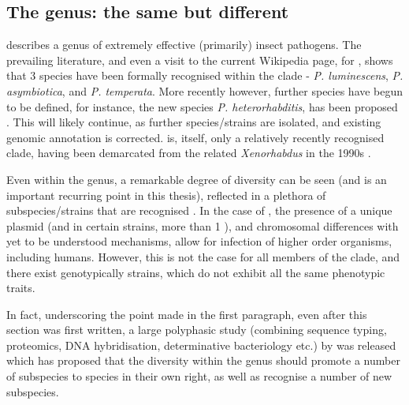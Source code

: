 \subsection{The \Pa{} genus: the same but different}
\Pa{} describes a genus of extremely effective (primarily) insect pathogens. The prevailing literature, and even a visit to the current Wikipedia page, for \Pa{}, shows that 3 species have been formally recognised within the clade - \textit{P. luminescens}, \textit{P. asymbiotica}, and \textit{P. temperata}. More recently however, further species have begun to be defined, for instance, the new species \textit{P. heterorhabditis}, has been proposed \citep{Naidoo2015}. This will likely continue, as further species/strains are isolated, and existing genomic annotation is corrected. \Pa{} is, itself, only a relatively recently recognised clade, having been demarcated from the related \emph{Xenorhabdus} in the 1990s \citep{Saux1999a,Boemare1993}.

Even within the genus, a remarkable degree of diversity can be seen (and is an important recurring point in this thesis), reflected in a plethora of subspecies/strains that are recognised \citep{Peat2010}. In the case of \Pasy, the presence of a unique plasmid (and in certain strains, more than 1 \citep{Wilkinson2010a}), and chromosomal differences with yet to be understood mechanisms, allow for infection of higher order organisms, including humans. However, this is not the case for all members of the \Pasy{} clade, and there exist genotypically \Pasy{} strains, which do not exhibit all the same phenotypic traits.

In fact, underscoring the point made in the first paragraph, even after this section was first written, a large polyphasic study (combining sequence typing, proteomics, DNA hybridisation, determinative bacteriology etc.) by \cite{Machado2018} was released which has proposed that the diversity within the genus should promote a number of subspecies to species in their own right, as well as recognise a number of new subspecies.

